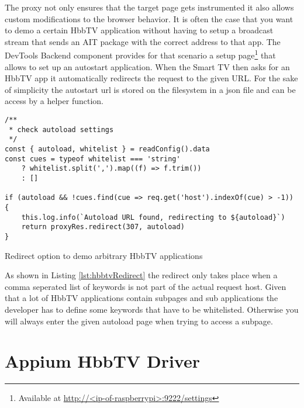 The proxy not only ensures that the target page gets instrumented it also allows custom modifications to the
browser behavior. It is often the case that you want to demo a certain HbbTV application without having to
setup a broadcast stream that sends an AIT package with the correct address to that app. The DevTools Backend
component provides for that scenario a setup page\footnote{Available at \url{http://<ip-of-raspberrypi>:9222/settings}}
that allows to set up an autostart application. When the Smart TV then asks for an HbbTV app it automatically
redirects the request to the given URL. For the sake of simplicity the autostart url is stored on the filesystem
in a json file and can be access by a helper function.

\begin{listing}[H]
\begin{verbatim}
/**
 * check autoload settings
 */
const { autoload, whitelist } = readConfig().data
const cues = typeof whitelist === 'string'
    ? whitelist.split(',').map((f) => f.trim())
    : []

if (autoload && !cues.find(cue => req.get('host').indexOf(cue) > -1)) {
    this.log.info(`Autoload URL found, redirecting to ${autoload}`)
    return proxyRes.redirect(307, autoload)
}
\end{verbatim}
\caption{Redirect option to demo arbitrary HbbTV applications}
\label{lst:hbbtvRedirect}
\end{listing}

As shown in Listing \ref{lst:hbbtvRedirect} the redirect only takes place when a comma seperated list
of keywords is not part of the actual request host. Given that a lot of HbbTV applications contain subpages
and sub applications the developer has to define some keywords that have to be whitelisted. Otherwise
you will always enter the given autoload page when trying to access a subpage.

\section{Appium HbbTV Driver\label{sec:driver}}


